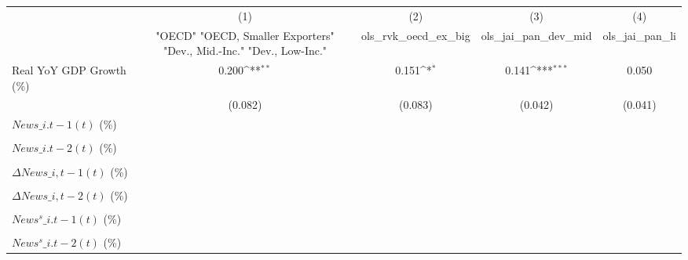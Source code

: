 {
\def\sym#1{\ifmmode^{#1}\else\(^{#1}\)\fi}
\begin{tabular}{l*{4}{c}}
\toprule
                    &\multicolumn{1}{c}{(1)}&\multicolumn{1}{c}{(2)}&\multicolumn{1}{c}{(3)}&\multicolumn{1}{c}{(4)}\\
                    &\multicolumn{1}{c}{ "OECD" "OECD, Smaller Exporters" "Dev., Mid.-Inc." "Dev., Low-Inc."}&\multicolumn{1}{c}{ols\_rvk\_oecd\_ex\_big}&\multicolumn{1}{c}{ols\_jai\_pan\_dev\_mid}&\multicolumn{1}{c}{ols\_jai\_pan\_li}\\
\midrule
Real YoY GDP Growth (\%)&       0.200\sym{**} &       0.151\sym{*}  &       0.141\sym{***}&       0.050         \\
                    &     (0.082)         &     (0.083)         &     (0.042)         &     (0.041)         \\
\addlinespace
$ News\_{i.t-1}(t)$ (\%)&                     &                     &                     &                     \\
                    &                     &                     &                     &                     \\
\addlinespace
$ News\_{i.t-2}(t)$ (\%)&                     &                     &                     &                     \\
                    &                     &                     &                     &                     \\
\addlinespace
$ \Delta News\_{i,t-1}(t)$ (\%)&                     &                     &                     &                     \\
                    &                     &                     &                     &                     \\
\addlinespace
$ \Delta News\_{i,t-2}(t)$ (\%)&                     &                     &                     &                     \\
                    &                     &                     &                     &                     \\
\addlinespace
$ News^s\_{i.t-1}(t)$ (\%)&                     &                     &                     &                     \\
                    &                     &                     &                     &                     \\
\addlinespace
$ News^s\_{i.t-2}(t)$ (\%)&                     &                     &                     &                     \\

\end{tabular}}
